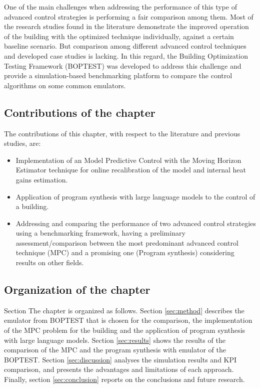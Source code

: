 One of the main challenges when addressing the performance of this type of advanced control strategies is performing a fair comparison among them. Most of the research studies found in the literature demonstrate the improved operation of the building with the optimized technique individually, against a certain baseline scenario. But comparison among different advanced control techniques and developed case studies is lacking. In this regard, the Building Optimization Testing Framework (BOPTEST) \cite{Blum2021} was developed to address this challenge and provide a simulation-based benchmarking platform to compare the control algorithms on some common emulators.

\subsection{Contributions of the chapter}
\label{sec:contribution}
The contributions of this chapter, with respect to the literature and previous studies, are:
\begin{itemize}
  \item Implementation of an Model Predictive Control with the Moving Horizon Estimator technique for online recalibration of the model and internal heat gains estimation.
  \item Application of program synthesis with large language models to the control of a building.
  \item Addressing and comparing the performance of two advanced control strategies using a benchmarking framework, having a preliminary assessment/comparison between the most predominant advanced control technique (MPC) and a promising one (Program synthesis) considering results on other fields.
\end{itemize}

\subsection{Organization of the chapter}
Section \label{sec:organization}
The chapter is organized as follows. Section \ref{sec:method}  describes the emulator from BOPTEST that is chosen for the comparison, the implementation of the MPC problem for the building and the application of program synthesis with large language models. Section \ref{sec:results} shows the results of the comparison of the MPC and the program synthesis with emulator of the BOPTEST. Section \ref{sec:discussion} analyses the simulation results and KPI comparison, and presents the advantages and limitations of each approach. Finally, section \ref{sec:conclusion} reports on the conclusions and future research.

